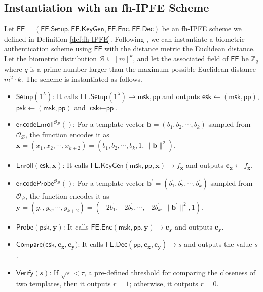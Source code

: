 
\subsection{Instantiation with an fh-IPFE Scheme}
\label{sec:fh-IPFE-instantiation}

Let $\textsf{FE} = (\textsf{FE.Setup}, \textsf{FE.KeyGen}, \textsf{FE.Enc}, \textsf{FE.Dec})$ be an fh-IPFE scheme we defined in Definition \ref{def:fh-IPFE}. Following \cite{cryptoeprint:2023/481}, we can instantiate a biometric authentication scheme using $\textsf{FE}$ with the distance metric the Euclidean distance. Let the biometric distribution $\mathcal{B} \subseteq [m]^k$, and let the associated field of $\textsf{FE}$ be $\mathbb{Z}_q$ where $q$ is a prime number larger than the maximum possible Euclidean distance $m^2 \cdot k$. The scheme is instantiated as follows.

\begin{itemize}

	\item $\textsf{Setup}(1^\lambda)$: It calls $\textsf{FE.Setup}(1^\lambda) \to \textsf{msk}, \textsf{pp}$ and outputs $\textsf{esk} \gets (\textsf{msk}, \textsf{pp})$, $\textsf{psk} \gets (\textsf{msk}, \textsf{pp})$ and $\textsf{csk} \gets \textsf{pp}$.

	\item $\textsf{encodeEnroll}^{\mathcal{O}_{\mathcal{B}}}()$: For a template vector $\mathbf{b} = (b_1, b_2, \cdots, b_k)$ sampled from $\mathcal{O}_{\mathcal{B}}$, the function encodes it as $\mathbf{x} = (x_1, x_2, \cdots, x_{k+2}) = (b_1, b_2, \cdots, b_k, 1, \|\mathbf{b}\|^2)$. 

	\item $\textsf{Enroll}(\textsf{esk}, \mathbf{x})$: It calls $\textsf{FE.KeyGen}(\textsf{msk}, \textsf{pp}, \mathbf{x}) \to f_\mathbf{x}$ and outputs $\mathbf{c_x} \gets f_\mathbf{x}$.

	\item $\textsf{encodeProbe}^{\mathcal{O}_{\mathcal{B}}}()$: For a template vector $\mathbf{b}^\prime = (b_1^\prime, b_2^\prime, \cdots, b_k^\prime)$ sampled from $\mathcal{O}_{\mathcal{B}}$, the function encodes it as $\mathbf{y} = (y_1, y_2, \cdots, y_{k+2}) = (-2b_1^\prime, -2b_2^\prime, \cdots, -2b_k^\prime, \|\mathbf{b}^\prime\|^2, 1)$.

	\item $\textsf{Probe}(\textsf{psk}, \mathbf{y})$: It calls $\textsf{FE.Enc}(\textsf{msk}, \textsf{pp}, \mathbf{y}) \to \mathbf{c_y}$ and outputs $\mathbf{c_y}$.

	\item $\textsf{Compare}(\textsf{csk}, \mathbf{c_x}, \mathbf{c_y)}$: It calls $\textsf{FE.Dec}(\textsf{pp}, \mathbf{c_x}, \mathbf{c_y}) \to s$ and outputs the value $s$.

	\item $\textsf{Verify}(s)$: If $\sqrt{s} < \tau$, a pre-defined threshold for comparing the closeness of two templates, then it outputs $r = 1$; otherwise, it outputs $r = 0$.

\end{itemize}

